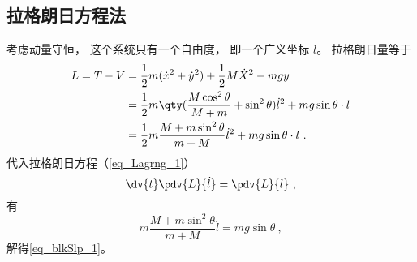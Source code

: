 \subsection{拉格朗日方程法}
考虑动量守恒， 这个系统只有一个自由度， 即一个广义坐标 $l$。 拉格朗日量等于
\begin{equation}
\begin{aligned}
L = T - V &= \frac12 m(\dot x^2 + \dot y^2) + \frac12 M \dot X^2 - mgy\\
&= \frac{1}{2}m \qty( \frac{M\cos^2\theta}{M + m}+\sin^2\theta) \dot l^2 + mg\sin\theta \cdot l\\
&=\frac{1}{2}m\frac{M+m\sin^2\theta}{m+M}\dot{l}^2+mg\sin\theta\cdot l~.
\end{aligned}
\end{equation}
代入拉格朗日方程（\autoref{eq_Lagrng_1}）
\begin{equation}
\dv{t} \pdv{L}{\dot l} = \pdv{L}{l}~,
\end{equation}
有
\begin{equation}
m\frac{M+m\sin^2\theta}{m+M}\ddot{l}=mg\sin\theta~,
\end{equation}
解得\autoref{eq_blkSlp_1}。
